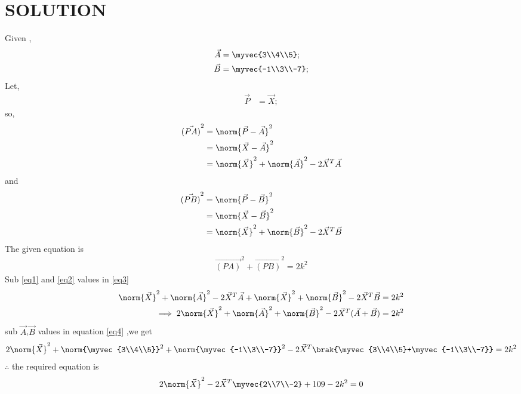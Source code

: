 \documentclass[journal,12pt,twocolumn]{IEEEtran}
\begin{document}
\section{SOLUTION} 
Given ,
\begin{align}
\vec A &=\myvec{3\\4\\5};
  \\
  \vec B &=\myvec{-1\\3\\-7};
\end{align}
Let,
\begin{align}
 \vec P &=\vec{X};
\end{align}
 so,
 \begin{align}
 \vec{(PA)}^2&=\norm{\vec P-\vec A}^2\\
 &=\norm{\vec X-\vec A}^2\\
 &=\norm{\vec X}^2+\norm{\vec A}^2-2\vec X^T\vec A\label{eq1}
 \end{align}
 and
 \begin{align}
 \vec{(PB)}^2&=\norm{\vec P-\vec B}^2\\
 &=\norm{\vec X-\vec B}^2\\
 &=\norm{\vec X}^2+\norm{\vec B}^2-2\vec X^T\vec B\label{eq2}
 \end{align}
 The given equation is
\begin{align}
 \vec{(PA)}^2+ \vec{(PB)}^2 =2k^2\label{eq3}
 \end{align}
 Sub \eqref{eq1} and \eqref{eq2}   values in \eqref{eq3} 
\begin{align}
\norm{\vec X}^2+\norm{\vec A}^2-2\vec X^T\vec A+\norm{\vec X}^2+\norm{\vec B}^2-2\vec X^T\vec B=2k^2\\
\implies 2\norm{\vec X}^2+\norm{\vec A}^2+\norm{\vec B}^2-2\vec X^T(\vec A+\vec B)=2k^2\label{eq4} 
\end{align}
sub $\vec A$,$\vec B$ values in equation \eqref{eq4} ,we get
\begin{align}
 2\norm{\vec X}^2+\norm{\myvec{3\\4\\5}}^2+\norm{\myvec{-1\\3\\-7}}^2-2\vec X^T\brak{\myvec{3\\4\\5}+\myvec{-1\\3\\-7}}=2k^2
 \end{align}
 $\therefore$ the required equation is
 \begin{align}
  2\norm{\vec X}^2-2\vec X^T\myvec{2\\7\\-2}+109-2k^2=0
\end{align}
\end{document}
